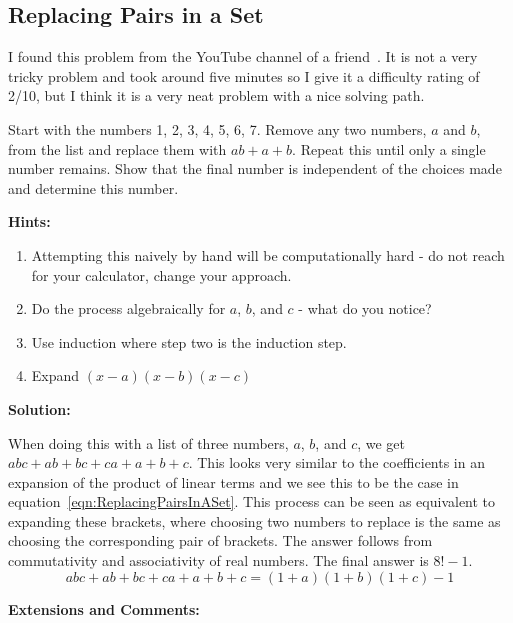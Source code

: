 \subsection{Replacing Pairs in a Set}

I found this problem from the YouTube channel of a friend~\cite{ReplacingPairsInSet}. It is not a very tricky problem and took around five minutes so I give it a difficulty rating of 2/10, but I think it is a very neat problem with a nice solving path.

Start with the numbers 1, 2, 3, 4, 5, 6, 7. Remove any two numbers, $a$ and $b$, from the list and replace them with $ab + a + b$. Repeat this until only a single number remains. Show that the final number is independent of the choices made and determine this number.

\textbf{Hints:}

\begin{enumerate}
	\item Attempting this naively by hand will be computationally hard - do not reach for your calculator, change your approach.
	\item Do the process algebraically for $a$, $b$, and $c$ - what do you notice?
	\item Use induction where step two is the induction step.
	\item Expand $(x - a)(x - b)(x - c)$
\end{enumerate}

\textbf{Solution:}

When doing this with a list of three numbers, $a$, $b$, and $c$, we get $abc + ab + bc + ca + a + b + c$. This looks very similar to the coefficients in an expansion of the product of linear terms and we see this to be the case in equation~\eqref{eqn:ReplacingPairsInASet}. This process can be seen as equivalent to expanding these brackets, where choosing two numbers to replace is the same as choosing the corresponding pair of brackets. The answer follows from commutativity and associativity of real numbers. The final answer is $8! - 1$.
\begin{equation}
	abc + ab + bc + ca + a + b + c = (1 + a)(1 + b)(1 + c) - 1\label{eqn:ReplacingPairsInASet}
\end{equation}


\textbf{Extensions and Comments:}